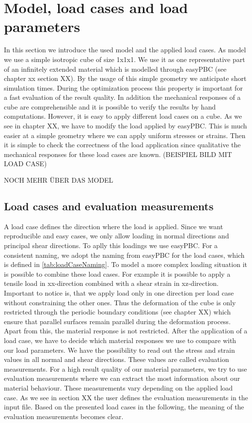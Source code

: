     \section{Model, load cases and load parameters}
    In this section we introduce the used model and the applied load cases. 
    As model we use a simple isotropic cube of size 1x1x1. We use it as one representative part of an infinitely extended material which is modelled through easyPBC (see chapter xx section XX). By the usage of this simple geometry we anticipate short simulation times. During the optimization process this property is important for a fast evaluation of the result quality. In addition the mechanical responses of a cube are comprehensible and it is possible to verify the results by hand computations. However, it is easy to apply different load cases on a cube. As we see in chapter XX, we have to modify the load applied by easyPBC. This is much easier at a simple geometry where we can apply uniform stresses or strains. Then it is simple to check the correctness of the load application since qualitative the mechanical responses for these load cases are known. (BEISPIEL BILD MIT LOAD CASE)
    
    NOCH MEHR ÜBER DAS MODEL
    
    \subsection{Load cases and evaluation measurements}
    
    A load case defines the direction where the load is applied. Since we want reproducible and easy cases, we only allow loading in normal directions and principal shear directions. To aplly this loadings we use easyPBC. For a consistent naming, we adopt the naming from easyPBC for the load cases, which is defined in \autoref{tab:loadCaseNaming}.
     To model a more complex loading situation it is possible to combine these load cases. For example it is possible to apply a tensile load in xx-direction combined with a shear strain in xz-direction. Important to notice is, that we apply load only in one direction per load case without constraining the other ones. Thus the deformation of the cube is only restricted through the periodic boundary conditions (see chapter XX) which ensure that parallel surfaces remain parallel during the deformation process. Apart from this, the material response is not restricted. After the application of a load case, we have to decide which material responses we use to compare with our load parameters. We have the possibility to read out the stress and strain values in all normal and shear directions. These values are called evaluation measurements. For a high result quality of our material parameters, we try to use evaluation measurements where we can extract the most information about our material behaviour. These measurements vary depending on the applied load case. As we see in section XX the user defines the evaluation measurements in the input file. Based on the presented load cases in the following, the meaning of the evaluation measurements becomes clear. 

